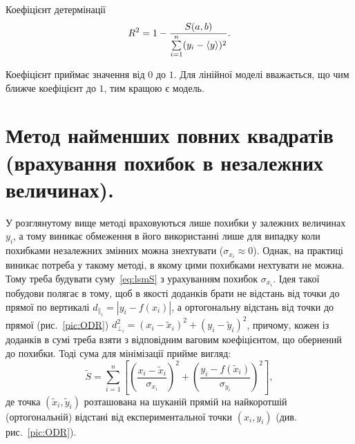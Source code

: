 \documentclass{LabBook}
\begin{document}
\begin{More}{Коефіцієнт детермінації}
	\begin{equation}\label{}
		R^2 = 1 - \frac{S(a,b)}{\sum\limits_{i = 1}^n (y_i - \left\langle y \right\rangle)^2}.
	\end{equation}

	Коефіцієнт приймає значення від $0$ до $1$. Для лінійної моделі вважається, що чим ближче коефіцієнт до $1$, тим кращою є модель.
\end{More}


\section{Метод найменших повних квадратів (врахування похибок в незалежних величинах).}


У розглянутому вище методі враховуються лише похибки у залежних величинах $y_i$, а тому виникає обмеження в його використанні лише для випадку коли похибками незалежних змінних можна знехтувати ($\sigma_{x_i} \approx 0$).  Однак, на практиці виникає потреба у такому методі, в якому цими похибками нехтувати не можна. Тому треба будувати суму~\eqref{eq:lsmS} з урахуванням похибок $\sigma_{x_i}$. Ідея такої побудови полягає в тому, щоб в якості
доданків брати не відстань від точки до прямої по вертикалі $d_{\parallel_i} = |y_i - f(x_i)|$, а ортогональну відстань від точки до прямої (рис.~\ref{pic:ODR}) $d^2_{\perp_i} = (x_i - \tilde{x}_i)^2  + (y_i - \tilde{y}_i)^2$, причому, кожен із доданків в сумі треба взяти з відповідним ваговим коефіцієнтом, що обернений до похибки. Тоді сума для мінімізації прийме вигляд:
\begin{equation}\label{eq:lsmODR}
	\tilde{S} = \sum\limits_{i = 1}^n  \left[\left(\frac{x_i - \tilde{x}_i}{\sigma_{x_i}}\right)^2 + \left(\frac{y_i - f(\tilde{x}_i)}{\sigma_{y_i}}\right)^2\right],
\end{equation}
де точка $(\tilde{x}_i,\tilde{y}_i)$ розташована на шуканій прямій на найкоротшій (ортогональній) відстані від експериментальної точки $(x_i, y_i)$ (див. рис.~\ref{pic:ODR}).
\end{document}
